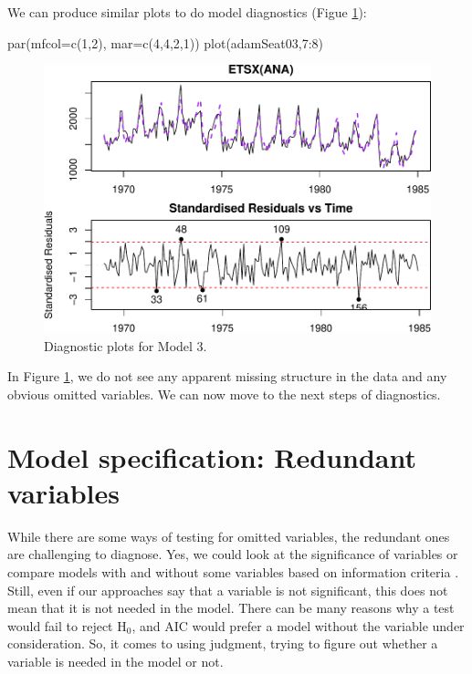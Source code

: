 \documentclass[
]{book}
\newenvironment{Shaded}{\begin{snugshade}}{\end{snugshade}}
\newcommand{\AttributeTok}[1]{\textcolor[rgb]{0.77,0.63,0.00}{#1}}
\newcommand{\DecValTok}[1]{\textcolor[rgb]{0.00,0.00,0.81}{#1}}
\newcommand{\FunctionTok}[1]{\textcolor[rgb]{0.00,0.00,0.00}{#1}}
\newcommand{\NormalTok}[1]{#1}
\newcommand{\SpecialCharTok}[1]{\textcolor[rgb]{0.00,0.00,0.00}{#1}}
\theoremstyle{definition}
\theoremstyle{definition}
\theoremstyle{definition}
\theoremstyle{definition}
\theoremstyle{remark}
\begin{document}
We can produce similar plots to do model diagnostics (Figue \ref{fig:adamSeat03}):

\begin{Shaded}
\begin{Highlighting}[]
\FunctionTok{par}\NormalTok{(}\AttributeTok{mfcol=}\FunctionTok{c}\NormalTok{(}\DecValTok{1}\NormalTok{,}\DecValTok{2}\NormalTok{), }\AttributeTok{mar=}\FunctionTok{c}\NormalTok{(}\DecValTok{4}\NormalTok{,}\DecValTok{4}\NormalTok{,}\DecValTok{2}\NormalTok{,}\DecValTok{1}\NormalTok{))}
\FunctionTok{plot}\NormalTok{(adamSeat03,}\DecValTok{7}\SpecialCharTok{:}\DecValTok{8}\NormalTok{)}
\end{Highlighting}
\end{Shaded}

\begin{figure}
\centering
\includegraphics{Svetunkov--2022----ADAM_files/figure-latex/adamSeat03-1.pdf}
\caption{\label{fig:adamSeat03}Diagnostic plots for Model 3.}
\end{figure}

In Figure \ref{fig:adamSeat03}, we do not see any apparent missing structure in the data and any obvious omitted variables. We can now move to the next steps of diagnostics.

\hypertarget{diagnosticsRedundant}{%
\section{Model specification: Redundant variables}\label{diagnosticsRedundant}}

While there are some ways of testing for omitted variables, the redundant ones are challenging to diagnose. Yes, we could look at the significance of variables \citep[Section 5.3 of][]{SvetunkovSBA} or compare models with and without some variables based on information criteria \citep[Section 13.4 of][]{SvetunkovSBA}. Still, even if our approaches say that a variable is not significant, this does not mean that it is not needed in the model. There can be many reasons why a test would fail to reject H\(_0\), and AIC would prefer a model without the variable under consideration. So, it comes to using judgment, trying to figure out whether a variable is needed in the model or not.
\end{document}
